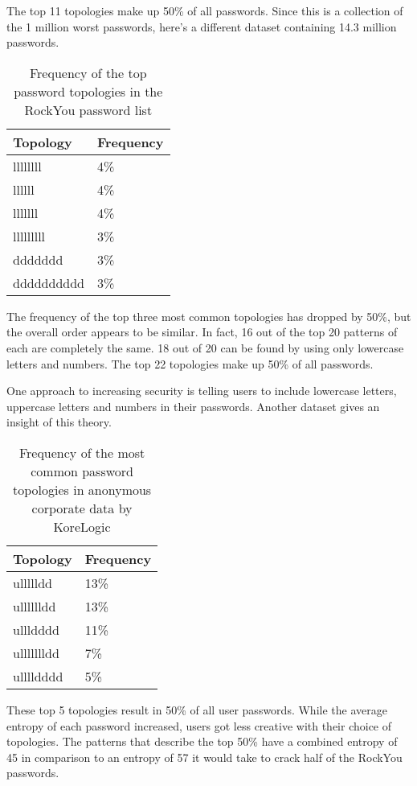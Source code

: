 The top 11 topologies make up 50\% of all passwords. Since this is a collection of the 1 million worst passwords, here's a different dataset containing 14.3 million passwords.

\begin{table}[h!]
\centering
\begin{tabular}{l l}
	Topology	& Frequency \\
	\hline
	llllllll	& 4\% \\
	llllll		& 4\% \\
	lllllll		& 4\% \\
	lllllllll	& 3\% \\
	ddddddd		& 3\% \\
	dddddddddd	& 3\%
\end{tabular}
\caption{Frequency of the top password topologies in the RockYou password list}
\cite{rockyou}
\end{table}

The frequency of the top three most common topologies has dropped by 50\%, but the overall order appears to be similar. In fact, 16 out of the top 20 patterns of each are completely the same. 18 out of 20 can be found by using only lowercase letters and numbers. The top 22 topologies make up 50\% of all passwords.

One approach to increasing security is telling users to include lowercase letters, uppercase letters and numbers in their passwords. Another dataset gives an insight of this theory.

\begin{table}[h!]
\centering
\begin{tabular}{l l}
	Topology	& Frequency \\
	\hline
	ullllldd	& 13\% \\
	ulllllldd	& 13\% \\
	ullldddd	& 11\% \\
	ullllllldd	& 7\% \\
	ulllldddd	& 5\%
\end{tabular}
\caption{Frequency of the most common password topologies in anonymous corporate data by KoreLogic}
\cite{korelogic}
\end{table}

These top 5 topologies result in 50\% of all user passwords. While the average entropy of each password increased, users got less creative with their choice of topologies. The patterns that describe the top 50\% have a combined entropy of 45 in comparison to an entropy of 57 it would take to crack half of the RockYou passwords.

